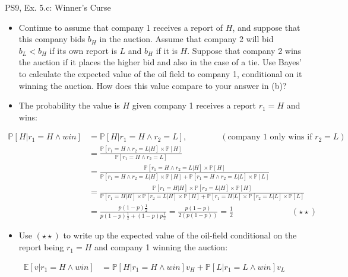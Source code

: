 \begin{frame}{PS9, Ex. 5.c: Winner's Curse}
      \begin{itemize}
        \item[(c)] Continue to assume that company 1 receives a report of $H$, and suppose that this company bids $b_H$ in the auction. Assume that company 2 will bid $b_L < b_H$ if its own report is $L$ and $b_H$ if it is $H$. Suppose that company 2 wins the auction if it places the higher bid and also in the case of a tie. Use Bayes’ to calculate the expected value of the oil field to company 1, conditional on it winning the auction. How does this value compare to your answer in (b)?
        \item[Step 1:] The probability the value is $H$ given company 1 receives a report $r_1=H$ and wins:
        \end{itemize}
        \vspace{-8pt}
        \begin{align*}
            \mathbb{P}[H|r_1=H\wedge win]&=\mathbb{P}[H|r_1=H\wedge r_2=L],\quad\quad\quad\quad(\text{company 1 only wins if }r_2=L)\\
            &=\frac{\mathbb{P}[r_1=H\wedge r_2=L|H]\times\mathbb{P}[H]}{\mathbb{P}[r_1=H\wedge r_2=L]}&\\
            &=\frac{\mathbb{P}[r_1=H\wedge r_2=L|H]\times\mathbb{P}[H]}{\mathbb{P}[r_1=H\wedge r_2=L|H]\times\mathbb{P}[H]+\mathbb{P}[r_1=H\wedge r_2=L|L]\times\mathbb{P}[L]}&\\
            &=\frac{\mathbb{P}[r_1=H|H]\times\mathbb{P}[r_2=L|H]\times\mathbb{P}[H]}{\mathbb{P}[r_1=H|H]\times\mathbb{P}[r_2=L|H]\times\mathbb{P}[H]+\mathbb{P}[r_1=H|L]\times\mathbb{P}[r_2=L|L]\times\mathbb{P}[L]}&\\
            &=\frac{p(1-p)\frac{1}{2}}{p(1-p)\frac{1}{2}+(1-p)p\frac{1}{2}}=\frac{p(1-p)}{2(p(1-p))}=\frac{1}{2}\quad\quad\quad\quad\quad\quad\quad(\star\star)
        \end{align*}
        \vspace{-8pt}
        \begin{itemize}
        \item[Step 2:] Use $(\star\star)$ to write up the expected value of the oil-field conditional on the report being $r_1=H$ and company 1 winning the auction:
      \end{itemize}
      \vspace{-4pt}
      \begin{align*}
        \mathbb{E}[v|r_1=H\wedge win]&=\mathbb{P}[H|r_1=H\wedge win]v_H+\mathbb{P}[L|r_1=L\wedge win]v_L
      \end{align*}
      \vfill\null
\end{frame}
